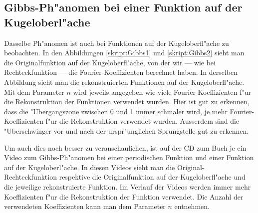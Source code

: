 \begin{refsection}
\subsection{Gibbs-Ph"anomen bei einer Funktion auf der Kugeloberl"ache}
Dasselbe Ph"anomen ist auch bei Funktionen auf der Kugeloberfl"ache 
zu beobachten. 
In den Abbildungen \ref{skript:Gibbs1} und \ref{skript:Gibbs2} sieht 
man die Originalfunktion auf der Kugeloberfl"ache, von der wir --- 
wie bei Rechteckfunktion --- die Fourier-Koeffizienten berechnet haben. 
In derselben Abbildung sieht man die rekonstruierten Funktionen auf 
der Kugeloberfl"ache. 
Mit dem Parameter $n$ wird jeweils angegeben wie viele 
Fourier-Koeffizienten f"ur die Rekonstruktion der Funktionen 
verwendet wurden. 
Hier ist gut zu erkennen, dass die "Ubergangszone zwischen 0 und 1 
immer schmaler wird, je mehr Fourier-Koeffizienten f"ur die 
Rekonstruktion verwendet wurden. 
Ausserdem sind die "Uberschwinger vor und nach der urspr"unglichen 
Sprungstelle gut zu erkennen.

Um auch dies noch besser zu veranschaulichen, ist auf der CD zum Buch 
je ein Video zum Gibbs-Ph"anomen bei einer periodischen Funktion und 
einer Funktion auf der Kugeloberl"ache.
In diesen Videos sieht man die Original-Rechteckfunktion respektive
die Originalfunktion auf der Kugeloberfl"ache und die jeweilige
rekonstruierte Funktion. 
Im Verlauf der Videos werden immer mehr Koeffizienten f"ur die 
Rekonstruktion der Funktion verwendet.
Die Anzahl der verwendeten Koeffizienten kann man dem Parameter $n$
entnehmen.


\end{refsection}
